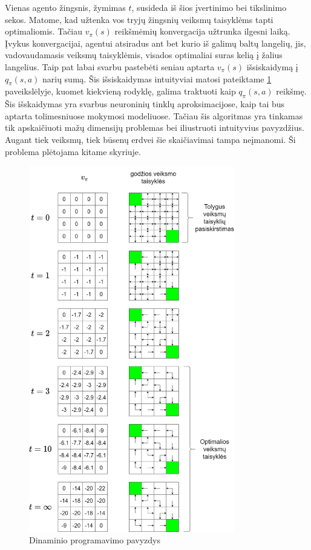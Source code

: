 \documentclass[a4paper, 12pt]{article}
\begin{document}
Vienas agento žingsnis, žymimas $t$, susideda iš šios įvertinimo bei tikslinimo sekos. Matome, kad užtenka vos tryjų žingsnių veiksmų taisyklėms tapti optimaliomis. Tačiau $v_{\pi}(s)$ reikšmėmių konvergacija užtrunka ilgesni laiką. Įvykus konvergacijai, agentui atsiradus ant bet kurio iš galimų baltų langelių, jis, vadovaudamasis veiksmų taisyklėmis, visados optimaliai suras kelią į žalius langelius. Taip pat labai svarbu pastebėti seniau aptarta $v_{\pi}(s)$ išsiskaidymą į $q_{\pi}(s, a)$ narių sumą. Šis išsiskaidymas intuityviai matosi pateiktame \ref{DynamicProgrammingExample} paveikslėlyje, kuomet kiekvieną rodyklę, galima traktuoti kaip $q_{\pi}(s, a)$ reikšmę. Šis išskaidymas yra svarbus neuroninių tinklų aproksimacijose, kaip tai bus aptarta tolimesniuose mokymosi modeliuose. Tačiau šis algoritmas yra tinkamas tik apskaičiuoti mažų dimensijų problemas bei iliustruoti intuityvius pavyzdžius. Augant tiek veiksmų, tiek būsenų erdvei šie skaičiavimai tampa neįmanomi. Ši problema plėtojama kitame skyriuje.


\begin{figure}[ht!]
\centering
\includegraphics[width=0.8\textwidth]{DynamicProgrammingExample}
\caption{Dinaminio programavimo pavyzdys }
\label{DynamicProgrammingExample}
\end{figure}
\end{document}
